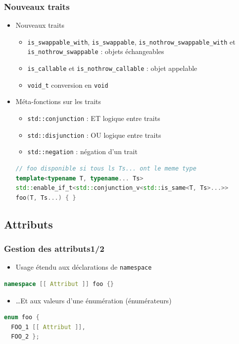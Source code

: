 \documentclass[C++.tex]{subfiles}
\begin{document}
\begin{frame}[fragile]
	\frametitle{Nouveaux traits}
	\begin{itemize}
		\item Nouveaux traits
		\begin{itemize}
			\item \lstinline|is_swappable_with|, \lstinline|is_swappable|, \lstinline|is_nothrow_swappable_with| et \lstinline|is_nothrow_swappable| : objets échangeables
			\item \lstinline|is_callable| et \lstinline|is_nothrow_callable| : objet appelable
			\item \lstinline|void_t| conversion en \lstinline|void|


		\end{itemize}
		\item Méta-fonctions sur les traits
		\begin{itemize}
			\item \lstinline|std::conjunction| : \og ET\fg{} logique entre traits
			\item \lstinline|std::disjunction| : \og OU\fg{} logique entre traits
			\item \lstinline|std::negation| : négation d'un trait
		\end{itemize}

	\begin{lstlisting}[language=C++]
// foo disponible si tous ls Ts... ont le meme type
template<typename T, typename... Ts>
std::enable_if_t<std::conjunction_v<std::is_same<T, Ts>...>>
foo(T, Ts...) { }\end{lstlisting}
	\end{itemize}
\end{frame}

\subsection*{Attributs}
\begin{frame}[fragile]
	\frametitle{Gestion des attributs\titlehfill{}1/2}
	\begin{itemize}
		\item Usage étendu aux déclarations de \lstinline|namespace|
	\end{itemize}

	\begin{lstlisting}[language=C++]
namespace [[ Attribut ]] foo {}\end{lstlisting}

	\begin{itemize}
		\item \ldots{}Et aux valeurs d'une énumération (énumérateurs)
	\end{itemize}

	\begin{lstlisting}[language=C++]
enum foo {
  FOO_1 [[ Attribut ]],
  FOO_2 };\end{lstlisting}
\end{frame}
\end{document}
